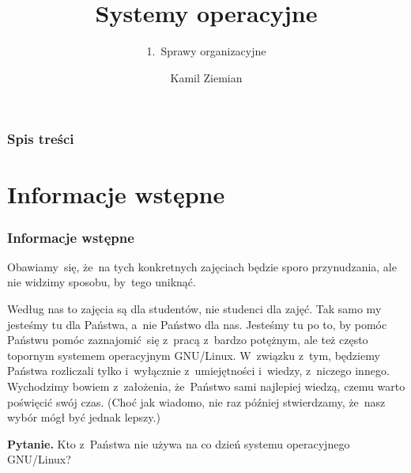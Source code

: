 \documentclass[10pt,t]{beamer}
\title{Systemy operacyjne}
\subtitle{1.~Sprawy organizacyjne}
\author{Kamil Ziemian \\
  \email}
\begin{document}





\RaggedRight





\maketitle





\begin{frame}
  \frametitle{Spis treści}


  \tableofcontents

\end{frame}





\section{Informacje wstępne}



\begin{frame}
  \frametitle{Informacje wstępne}


  Obawiamy~się, że~na tych konkretnych zajęciach będzie sporo przynudzania,
  ale nie widzimy sposobu, by~tego uniknąć.

  Według nas to zajęcia są dla studentów, nie studenci dla zajęć. Tak samo
  my jesteśmy tu dla Państwa, a~nie Państwo dla nas. Jesteśmy tu po to, by
  pomóc Państwu pomóc zaznajomić~się z~pracą z~bardzo potężnym, ale też
  często topornym systemem operacyjnym GNU/Linux. W~związku z~tym,
  będziemy Państwa rozliczali tylko i~wyłącznie z~umiejętności i~wiedzy,
  z~niczego innego. Wychodzimy bowiem z~założenia, że~Państwo sami najlepiej
  wiedzą, czemu warto poświęcić swój czas. (Choć jak wiadomo, nie raz
  później stwierdzamy, że~nasz wybór mógł być jednak lepszy.)

  \textbf{Pytanie.} Kto z~Państwa \alert{nie} używa na co dzień systemu
  operacyjnego GNU/Linux?

\end{frame}
\end{document}
